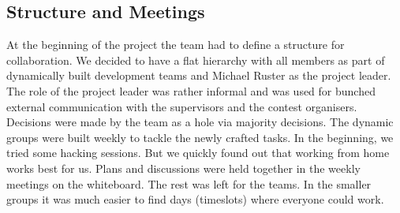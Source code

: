 \subsection{Structure and Meetings}
At the beginning of the project the team had to define a structure for collaboration. We decided to have a flat hierarchy with all members as part of dynamically built development teams and Michael Ruster as the project leader. The role of the project leader was rather informal and was used for bunched external communication with the supervisors and the contest organisers. Decisions were made by the team as a hole via majority decisions. The dynamic groups were built weekly to tackle the newly crafted tasks. In the beginning, we tried some hacking sessions. But we quickly found out that working from home works best for us. Plans and discussions were held together in the weekly meetings on the whiteboard. The rest was left for the teams. In the smaller groups it was much easier to find days (timeslots) where everyone could work.

